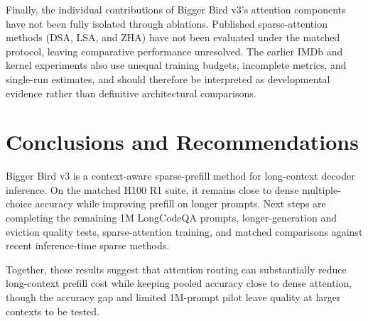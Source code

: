 \documentclass[11pt]{article}
\begin{document}
Finally, the individual contributions of Bigger Bird v3's attention components have not been fully isolated through ablations. Published sparse-attention methods (DSA, LSA, and ZHA) have not been evaluated under the matched protocol, leaving comparative performance unresolved. The earlier IMDb and kernel experiments also use unequal training budgets, incomplete metrics, and single-run estimates, and should therefore be interpreted as developmental evidence rather than definitive architectural comparisons. 

\section{Conclusions and Recommendations}
\label{sec:conclusions}
Bigger Bird v3 is a context-aware sparse-prefill method for long-context decoder inference. On the matched H100 R1 suite, it remains close to dense multiple-choice accuracy while improving prefill on longer prompts. Next steps are completing the remaining 1M LongCodeQA prompts, longer-generation and
eviction quality tests, sparse-attention training, and matched comparisons against recent inference-time sparse methods.

Together, these results suggest that attention routing can substantially reduce long-context prefill cost while keeping pooled accuracy close to dense attention, though the accuracy gap and limited 1M-prompt pilot leave quality at larger contexts to be tested.


\clearpage
{}



\clearpage
\appendix

\end{document}
